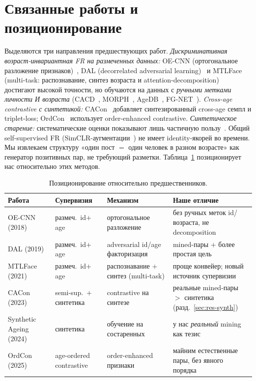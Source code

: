 \documentclass[journal]{IEEEtran}
\begin{document}
\section{Связанные работы и позиционирование}\label{sec:related}
Выделяются три направления предшествующих работ. \emph{Дискриминативная возраст-инвариантная FR на размеченных данных:} OE-CNN (ортогональное разложение признаков)~\cite{wang2018oecnn}, DAL (decorrelated adversarial learning)~\cite{wang2019dal} и MTLFace (multi-task: распознавание, синтез возраста и attention-decomposition)~\cite{huang2021mtlface} достигают высокой точности, но обучаются на данных с \emph{ручными метками личности И возраста} (CACD~\cite{chen2014cacd}, MORPH~\cite{ricanek2006morph}, AgeDB~\cite{moschoglou2017agedb}, FG-NET~\cite{panis2016fgnet}). \emph{Cross-age contrastive с синтетикой:} CACon~\cite{wang2024cacon} добавляет синтезированный cross-age семпл и triplet-loss; OrdCon~\cite{wang2025ordcon} использует order-enhanced contrastive. \emph{Синтетическое старение:} систематические оценки показывают лишь частичную пользу~\cite{yao2024synthageing}. Общий self-supervised FR (SimCLR-аугментации~\cite{chen2020simclr}) не имеет identity-якорей во времени. Мы извлекаем структуру «один пост $=$ один человек в разном возрасте» как генератор позитивных пар, не требующий разметки. Таблица~\ref{tab:positioning} позиционирует нас относительно этих методов.

\begin{table}[!t]
\renewcommand{\arraystretch}{1.25}
\caption{Позиционирование относительно предшественников.}
\label{tab:positioning}
\centering
\footnotesize
\begin{tabular}{@{}p{}p{}p{}p{}@{}}
\toprule
Работа & Супервизия & Механизм & Наше отличие \\
\midrule
OE-CNN (2018)~\cite{wang2018oecnn} & размеч.\ id$+$age & ортогональное разложение & без ручных меток id/возраста, не decomposition \\
DAL (2019)~\cite{wang2019dal} & размеч.\ id$+$age & adversarial id/age факторизация & mined-пары $+$ более простая цель \\
MTLFace (2021)~\cite{huang2021mtlface} & размеч.\ id$+$age & распознавание $+$ синтез (multi-task) & проще конвейер; новый источник супервизии \\
CACon (2023)~\cite{wang2024cacon} & semi-sup.\ $+$ синтетика & contrastive на синтезе & реальные mined-пары $>$ синтетика (разд.~\ref{sec:res-synth}) \\
Synthetic Ageing (2024)~\cite{yao2024synthageing} & синтетика & обучение на состаренных & у нас \emph{реальный} mining как тезис \\
OrdCon (2025)~\cite{wang2025ordcon} & age-ordered contrastive & order-enhanced признаки & майним естественные пары, без явного порядка \\
\bottomrule
\end{tabular}
\end{table}
\end{document}
